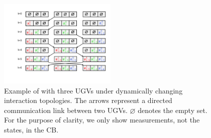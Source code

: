 	
	
	\begin{figure}%
		\centering
		\includegraphics[width=0.5\textwidth]{figures/fifo}
		\caption{Example of {\proto} with three UGVs under dynamically changing interaction topologies. The arrows represent a directed communication link between two UGVs. $\varnothing$ denotes the empty set. For the purpose of clarity, we only show measurements, not the states, in the CB.}
		\label{fig:\proto}
	\end{figure}		